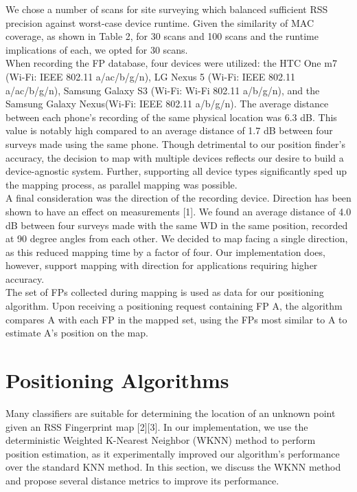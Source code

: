 \documentclass[conference]{IEEEtran}
\begin{document}
\indent We chose a number of scans for site surveying which balanced sufficient RSS precision against worst-case device runtime. Given the similarity of MAC coverage, as shown in Table 2, for 30 scans and 100 scans and the runtime implications of each, we opted for 30 scans.\\
\indent When recording the FP database, four devices were utilized: the HTC One m7 (Wi-Fi: IEEE 802.11 a/ac/b/g/n), LG Nexus 5  (Wi-Fi: IEEE 802.11 a/ac/b/g/n), Samsung Galaxy S3 (Wi-Fi: Wi-Fi 802.11 a/b/g/n), and the Samsung Galaxy Nexus(Wi-Fi: IEEE 802.11 a/b/g/n). The average distance between each phone's recording of the same physical location was 6.3 dB. This value is notably high compared to an average distance of 1.7 dB between four surveys made using the same phone. Though detrimental to our position finder's accuracy, the decision to map with multiple devices reflects our desire to build a device-agnostic system. Further, supporting all device types significantly sped up the mapping process, as parallel mapping was possible.\\
\indent A final consideration was the direction of the recording device. Direction has been shown to have an effect on measurements [1]. We found an average distance of 4.0 dB between four surveys made with the same WD in the same position, recorded at 90 degree angles from each other. We decided to map facing a single direction, as this reduced mapping time by a factor of four. Our implementation does, however, support mapping with direction for applications requiring higher accuracy.\\
\indent The set of FPs collected during mapping is used as data for our positioning algorithm. Upon receiving a positioning request containing FP A, the algorithm compares A with each FP in the mapped set, using the FPs most similar to A to estimate A's position on the map.

\section{Positioning Algorithms}
Many classifiers are suitable for determining the location of an unknown point given an RSS Fingerprint map [2][3]. In our implementation, we use the deterministic Weighted K-Nearest Neighbor (WKNN) method to perform position estimation, as it experimentally improved our algorithm's performance over the standard KNN method. In this section, we discuss the WKNN method and propose several distance metrics to improve its performance. 
\end{document}
